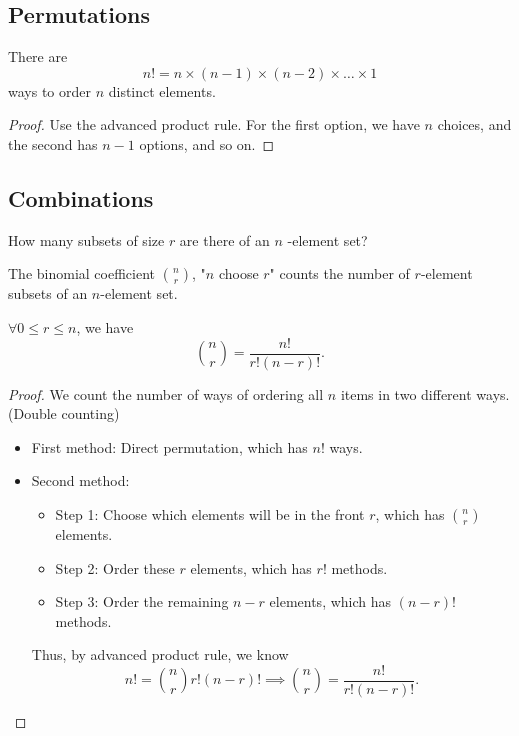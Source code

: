 \subsection{Permutations}
\begin{claim}
    There are
    \[
        n! = n \times (n - 1) \times (n - 2) \times \dots \times 1
    \]
    ways to order \(n\) distinct elements. 
\end{claim}
\begin{proof}
    Use the advanced product rule. For the first option, we have \(n\) choices, and the second has \(n - 1\) options, and so on.  
\end{proof}

\subsection{Combinations}
\begin{question}
    How many subsets of size \(r\) are there of an \(n\) -element set? 
\end{question}

\begin{definition}
    The binomial coefficient \(\binom{n}{r}\), "\(n\) choose \(r\)" counts the number of \(r\)-element subsets of an \(n\)-element set.   
\end{definition}

\begin{claim}
    \(\forall 0 \le r \le n\), we have 
    \[
        \binom{n}{r} = \frac{n!}{r!(n-r)!}.
    \] 
\end{claim}
\begin{proof}
    We count the number of ways of ordering all \(n\) items in two different ways. (Double counting)
    \begin{itemize}
        \item First method: Direct permutation, which has \(n!\) ways. 
        \item Second method: 
        \begin{itemize}
            \item Step 1: Choose which elements will be in the front \(r\), which has \(\binom{n}{r}\) elements.  
            \item Step 2: Order these \(r\) elements, which has \(r!\) methods. 
            \item Step 3: Order the remaining \(n-r\) elements, which has \((n-r)!\) methods.   
        \end{itemize}
        Thus, by advanced product rule, we know 
        \[
            n! = \binom{n}{r} r! (n-r)! \implies \binom{n}{r} = \frac{n!}{r!(n-r)!}.
        \]
    \end{itemize} 
\end{proof}

